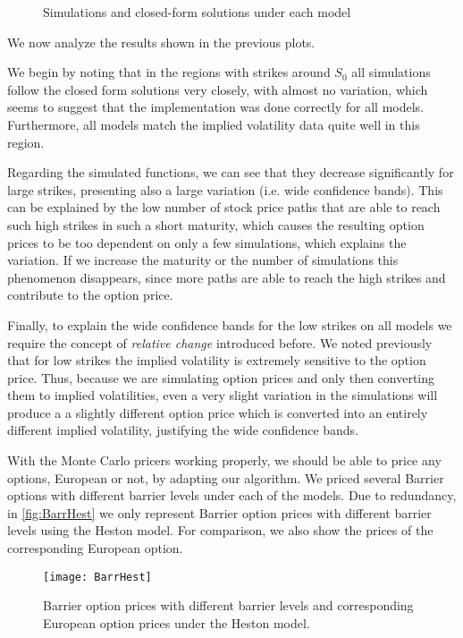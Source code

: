 \newpage
    
\begin{figure}[H]
  \begin{subfigmatrix}{1}
  \end{subfigmatrix}
  \caption{Simulations and closed-form solutions under each model}
\end{figure}
    
We now analyze the results shown in the previous plots.

We begin by noting that in the regions with strikes around $S_0$ all simulations follow the closed form solutions very closely, with almost no variation, which seems to suggest that the implementation was done correctly for all models. Furthermore, all models match the implied volatility data quite well in this region.

Regarding the simulated functions, we can see that they decrease significantly for large strikes, presenting also a large variation (i.e. wide confidence bands). This can be explained by the low number of stock price paths that are able to reach such high strikes in such a short maturity, which causes the resulting option prices to be too dependent on only a few simulations, which explains the variation. If we increase the maturity or the number of simulations this phenomenon disappears, since more paths are able to reach the high strikes and contribute to the option price.


Finally, to explain the wide confidence bands for the low strikes on all models we require the concept of \emph{relative change} introduced before. We noted previously that for low strikes the implied volatility is extremely sensitive to the option price. Thus, because we are simulating option prices and only then converting them to implied volatilities, even a very slight variation in the simulations will produce a a slightly different option price which is converted into an entirely different implied volatility, justifying the wide confidence bands.

With the Monte Carlo pricers working properly, we should be able to price any options, European or not, by adapting our algorithm.
We priced several Barrier options with different barrier levels under each of the models. Due to redundancy, in \autoref{fig:BarrHest} we only represent Barrier option prices with different barrier levels using the Heston model. For comparison, we also show the prices of the corresponding European option.

\begin{figure}[H]
    \centering
      \texttt{[image: BarrHest]}
      \caption{Barrier option prices with different barrier levels and corresponding European option prices under the Heston model.}\label{fig:BarrHest}
    \end{figure}
